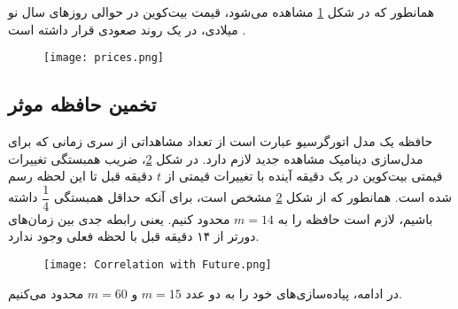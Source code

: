 \documentclass{scribe-cgenomics}
\begin{document}
\begin{مشاهده}

همانطور که در شکل 
\ref{prices}
 مشاهده می‌شود، قیمت بیت‌کوین در حوالی روز‌های سال نو میلادی، در یک روند صعودی قرار داشته است
 \cite{traidingview}.

\begin{figure}\label{prices}
\texttt{[image: prices.png]}
\centering
\end{figure}
\end{مشاهده}


\subsection{تخمین حافظه موثر}
حافظه یک مدل اتورگرسیو عبارت است از تعداد مشاهداتی از سری زمانی که برای مدل‌سازی دینامیک مشاهده جدید لازم دارد. در شکل
\ref{corr_with_future_m}، 
ضریب همبستگی تغییرات قیمتی بیت‌کوین در یک دقیقه آینده با تغییرات قیمتی از
$t$
دقیقه قبل تا این لحظه رسم شده است. همانطور که از شکل
\ref{corr_with_future_m}
 مشخص است، برای آنکه حداقل همبستگی
$\dfrac{1}{4}$
داشته باشیم، لازم است حافظه را به
$m=14$
محدود کنیم. یعنی رابطه جدی بین زمان‌های دورتر از ۱۴ دقیقه قبل با لحظه فعلی وجود ندارد.

\begin{figure}\label{corr_with_future_m}
\texttt{[image: Correlation with Future.png]}
\centering
\end{figure}

در ادامه، پیاده‌سازی‌های خود را به دو عدد
$m=15$
و
$m=60$
محدود می‌کنیم.
\end{document}
